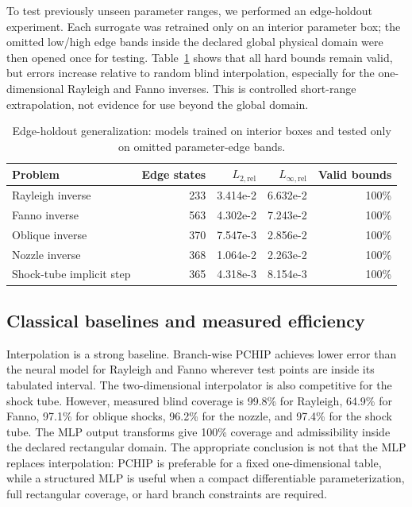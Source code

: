 \documentclass[11pt]{article}
\newenvironment{revision}{\color{revisionblue}}{}
\newenvironment{revision}{}{}
\newcommand{\relLtwo}{L_{2,\mathrm{rel}}}
\newcommand{\relLinf}{L_{\infty,\mathrm{rel}}}
\begin{document}
\begin{revision}
To test previously unseen parameter ranges, we performed an edge-holdout experiment. Each surrogate was retrained only on an interior parameter box; the omitted low/high edge bands inside the declared global physical domain were then opened once for testing. Table~\ref{tab:range} shows that all hard bounds remain valid, but errors increase relative to random blind interpolation, especially for the one-dimensional Rayleigh and Fanno inverses. This is controlled short-range extrapolation, not evidence for use beyond the global domain.

\begin{table}[ht]
\centering
\caption{Edge-holdout generalization: models trained on interior boxes and tested only on omitted parameter-edge bands.}
\label{tab:range}
\small
\begin{tabular}{lrrrr}
\toprule
Problem & Edge states & $\relLtwo$ & $\relLinf$ & Valid bounds \\
\midrule
Rayleigh inverse & 233 & 3.414e-2 & 6.632e-2 & 100\% \\
Fanno inverse & 563 & 4.302e-2 & 7.243e-2 & 100\% \\
Oblique inverse & 370 & 7.547e-3 & 2.856e-2 & 100\% \\
Nozzle inverse & 368 & 1.064e-2 & 2.263e-2 & 100\% \\
Shock-tube implicit step & 365 & 4.318e-3 & 8.154e-3 & 100\% \\
\bottomrule
\end{tabular}
\end{table}

\subsection{Classical baselines and measured efficiency}
Interpolation is a strong baseline. Branch-wise PCHIP achieves lower error than the neural model for Rayleigh and Fanno wherever test points are inside its tabulated interval. The two-dimensional interpolator is also competitive for the shock tube. However, measured blind coverage is 99.8\% for Rayleigh, 64.9\% for Fanno, 97.1\% for oblique shocks, 96.2\% for the nozzle, and 97.4\% for the shock tube. The MLP output transforms give 100\% coverage and admissibility inside the declared rectangular domain. The appropriate conclusion is not that the MLP replaces interpolation: PCHIP is preferable for a fixed one-dimensional table, while a structured MLP is useful when a compact differentiable parameterization, full rectangular coverage, or hard branch constraints are required.


\end{revision}
\end{document}

